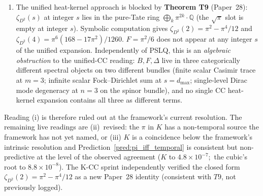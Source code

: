 \documentclass[11pt]{article}
\begin{document}
\begin{enumerate}
\begin{enumerate}
magnitude looser than the K residual itself ($4.8\times 10^{-7}$ for
the plain sum; $8.8\times 10^{-8}$ via Paper~2's self-consistency root
$1/\alpha + \alpha^2 = K$),
and so cannot explain the K precision even if elevated.
\item The unified heat-kernel approach is blocked by
\textbf{Theorem T9} (Paper~28): $\zeta_{D^2}(s)$ at integer $s$ lies in
the pure-Tate ring $\bigoplus_k\pi^{2k}\cdot\mathbb{Q}$ (the $\sqrt{\pi}$
slot is empty at integer $s$).
Symbolic computation gives $\zeta_{D^2}(2) = \pi^2 - \pi^4/12$ and
$\zeta_{D^2}(4) = \pi^6(168 - 17\pi^2)/1260$.  $F = \pi^2/6$ does not
appear at any integer $s$ of the unified expansion.  Independently
of PSLQ, this is an \emph{algebraic obstruction} to the
unified-CC reading: $B, F, \Delta$ live in three categorically
different spectral objects on two different bundles (finite scalar
Casimir trace at $m=3$; infinite scalar Fock--Dirichlet sum at
$s = d_\text{max}$; single-level Dirac mode degeneracy at $n=3$ on
the spinor bundle), and no single CC heat-kernel expansion contains
all three as different terms.
\end{enumerate}
Reading (i) is therefore ruled out at the framework's current
resolution.  The remaining live readings are (ii)~revised: the $\pi$
in $K$ has a non-temporal source the framework has not yet named, or
(iii) $K$ is a coincidence below the framework's intrinsic resolution
and Prediction~\ref{pred:pi_iff_temporal} is consistent but
non-predictive at the level of the observed agreement ($K$ to
$4.8\times10^{-7}$;\ the cubic's root to $8.8\times10^{-8}$).  The K-CC sprint independently
verified the closed form $\zeta_{D^2}(2) = \pi^2 - \pi^4/12$ as a
new Paper~28 identity (consistent with $T9$, not previously logged).


\end{enumerate}
\end{document}
